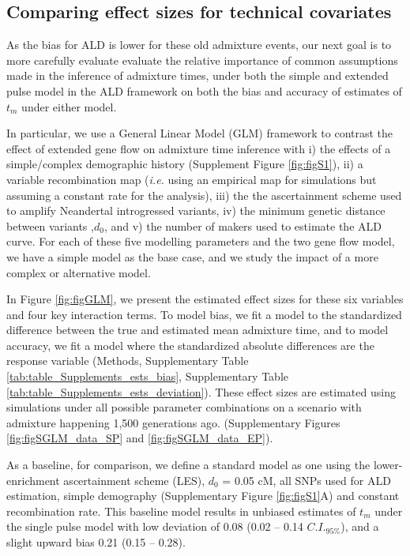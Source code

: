 \documentclass[11pt]{article}
\begin{document}
\subsection{Comparing effect sizes for technical covariates}\label{comparing effect sizes}


As the bias for ALD is lower for these old admixture events, our next goal is to more carefully evaluate evaluate the relative importance of common assumptions made in the inference of admixture times, under both the simple and extended pulse model in the ALD framework on both the bias and accuracy of estimates of $t_m$ under either model.

In particular, we use a General Linear Model (GLM) framework to contrast the effect of extended gene flow on admixture time inference with i) the effects of a simple/complex demographic history (Supplement Figure \ref{fig:figS1}), ii) a variable recombination map (\emph{i.e.} using an empirical map for simulations but assuming a constant rate for the analysis), iii) the the ascertainment scheme used to amplify Neandertal introgressed variants, iv) the minimum genetic distance between variants ,$d_0$, and v) the number of makers used to estimate the ALD curve. For each of these five modelling parameters and the two gene flow model, we have a simple model as the base case, and we study the impact of a more complex or alternative model.

In Figure \ref{fig:figGLM}, we present the estimated effect sizes for these six variables and four key interaction terms. 
To model bias, we fit a model to the  standardized difference between the true and estimated mean admixture time, and to model accuracy, we fit a model where the  standardized absolute differences are the response variable (Methods, Supplementary Table \ref{tab:table_Supplements_ests_bias}, Supplementary Table \ref{tab:table_Supplements_ests_deviation}). These effect sizes are estimated using simulations under all possible parameter combinations on a scenario with admixture happening 1,500 generations ago. (Supplementary Figures \ref{fig:figSGLM_data_SP} and \ref{fig:figSGLM_data_EP}).

As a baseline, for comparison, we define a standard model as one using the lower-enrichment ascertainment scheme (LES), $d_{0}$ = 0.05 cM, all SNPs used for ALD estimation, simple demography (Supplementary Figure \ref{fig:figS1}A) and constant recombination rate. This baseline model results in unbiased estimates of $t_m$ under the single pulse model with low deviation  of 0.08 (0.02 -- 0.14 $C.I._{95\%}$), and a slight upward bias 0.21 (0.15 -- 0.28).
\end{document}
